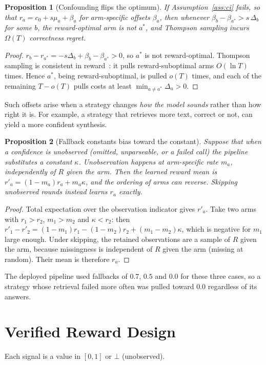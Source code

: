 \documentclass[conference]{IEEEtran}
\newtheorem{proposition}{Proposition}
\theoremstyle{definition}
\theoremstyle{remark}
\begin{document}
\begin{proposition}[Confounding flips the optimum]\label{prop:confound}
If Assumption~\ref{ass:ci} fails, so that $r_a=c_0+s\mu_a+\beta_a$ for arm-specific offsets $\beta_a$, then whenever $\beta_b-\beta_{a^*}>s\,\Delta_b$ for some $b$, the reward-optimal arm is not $a^*$, and Thompson sampling incurs $\Omega(T)$ correctness regret.
\end{proposition}
\begin{proof}
$r_b-r_{a^*}=-s\Delta_b+\beta_b-\beta_{a^*}>0$, so $a^*$ is not reward-optimal. Thompson sampling is consistent in reward~\cite{agrawal2012}: it pulls reward-suboptimal arms $O(\ln T)$ times. Hence $a^*$, being reward-suboptimal, is pulled $o(T)$ times, and each of the remaining $T-o(T)$ pulls costs at least $\min_{a\neq a^*}\Delta_a>0$.
\end{proof}
Such offsets arise when a strategy changes \emph{how the model sounds} rather than how right it is. For example, a strategy that retrieves more text, correct or not, can yield a more confident synthesis.

\begin{proposition}[Fallback constants bias toward the constant]\label{prop:missing}
Suppose that when a confidence is unobserved (omitted, unparseable, or a failed call) the pipeline substitutes a constant $\kappa$. Unobservation happens at arm-specific rate $m_a$, independently of $R$ given the arm. Then the learned reward mean is $r'_a=(1-m_a)r_a+m_a\kappa$, and the ordering of arms can reverse. Skipping unobserved rounds instead learns $r_a$ exactly.
\end{proposition}
\begin{proof}
Total expectation over the observation indicator gives $r'_a$. Take two arms with $r_1>r_2$, $m_1>m_2$ and $\kappa<r_2$: then $r'_1-r'_2=(1-m_1)r_1-(1-m_2)r_2+(m_1-m_2)\kappa$, which is negative for $m_1$ large enough. Under skipping, the retained observations are a sample of $R$ given the arm, because missingness is independent of $R$ given the arm (missing at random). Their mean is therefore $r_a$.
\end{proof}
The deployed pipeline used fallbacks of $0.7$, $0.5$ and $0.0$ for these three cases, so a strategy whose retrieval failed more often was pulled toward $0.0$ regardless of its answers.

\section{Verified Reward Design}\label{sec:design}
Each signal is a value in $[0,1]$ or $\bot$ (unobserved).
\end{document}
